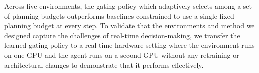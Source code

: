 \documentclass{article}
\newcommand{\Kset}{\mathcal{K}}
\begin{document}

Across five environments, the gating policy which adaptively selects among a set of planning budgets outperforms baselines constrained to use a single fixed planning budget at every step. To validate that the environments and method we designed capture the challenges of real-time decision-making, we transfer the learned gating policy to a real-time hardware setting where the environment runs on one GPU and the agent runs on a second GPU without any retraining or architectural changes to demonstrate that it performs effectively.





\end{document}
